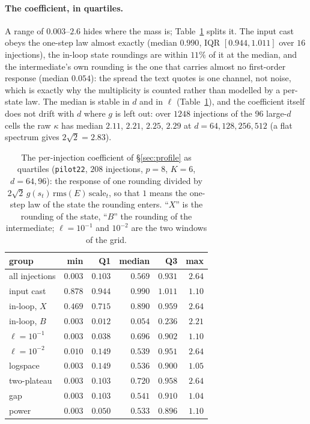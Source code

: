 \paragraph{The coefficient, in quartiles.}  A range of $0.003$--$2.6$ hides where the mass
is; Table~\ref{tab:w13} splits it.  The input cast obeys the one-step law almost exactly
(median $0.990$, IQR $[0.944,1.011]$ over $16$ injections), the in-loop state roundings are
within $11\%$ of it at the median, and the intermediate's own rounding is the one that
carries almost no first-order response (median $0.054$): the spread the text quotes is one
channel, not noise, which is exactly why the multiplicity is counted rather than modelled
by a per-state law.  The median is stable in $d$ and in $\ell$ (Table~\ref{tab:w13}), and
the coefficient itself does not drift with $d$ where $g$ is left out: over $1248$
injections of the 96 large-$d$ cells the raw $\kappa$ has median $2.11$, $2.21$, $2.25$,
$2.29$ at $d=64,128,256,512$ (a flat spectrum gives $2\sqrt2=2.83$).

\begin{table}[h]
\centering
\caption{The per-injection coefficient of \S\ref{sec:profile} as quartiles
(\texttt{pilot22}, $208$ injections, $p=8$, $K=6$, $d=64,96$): the response of one rounding
divided by $2\sqrt2\,g(s_t)\,\mathrm{rms}(E)\,\mathrm{scale}_t$, so that $1$ means the
one-step law of the state the rounding enters.  ``$X$'' is the rounding of the state,
``$B$'' the rounding of the intermediate; $\ell=10^{-1}$ and $10^{-2}$ are the two windows
of the grid.}
\label{tab:w13}
\begin{tabular}{lrrrrr}
\toprule
group & min & Q1 & median & Q3 & max \\
\midrule
all injections      & $0.003$ & $0.103$ & $0.569$ & $0.931$ & $2.64$ \\
input cast          & $0.878$ & $0.944$ & $0.990$ & $1.011$ & $1.10$ \\
in-loop, $X$        & $0.469$ & $0.715$ & $0.890$ & $0.959$ & $2.64$ \\
in-loop, $B$        & $0.003$ & $0.012$ & $0.054$ & $0.236$ & $2.21$ \\
$\ell=10^{-1}$      & $0.003$ & $0.038$ & $0.696$ & $0.902$ & $1.10$ \\
$\ell=10^{-2}$      & $0.010$ & $0.149$ & $0.539$ & $0.951$ & $2.64$ \\
logspace            & $0.003$ & $0.149$ & $0.536$ & $0.900$ & $1.05$ \\
two-plateau         & $0.003$ & $0.103$ & $0.720$ & $0.958$ & $2.64$ \\
gap                 & $0.003$ & $0.103$ & $0.541$ & $0.910$ & $1.04$ \\
power               & $0.003$ & $0.050$ & $0.533$ & $0.896$ & $1.10$ \\
\bottomrule
\end{tabular}
\end{table}

